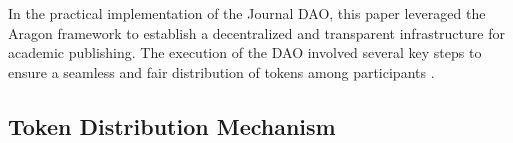 \documentclass[lettersize,journal]{IEEEtran}
\begin{document}

In the practical implementation of the Journal DAO, this paper leveraged the Aragon framework to establish a decentralized and transparent infrastructure for academic publishing. The execution of the DAO involved several key steps to ensure a seamless and fair distribution of tokens among participants \cite{el2020overview}.





\subsection{Token Distribution Mechanism}
\end{document}
